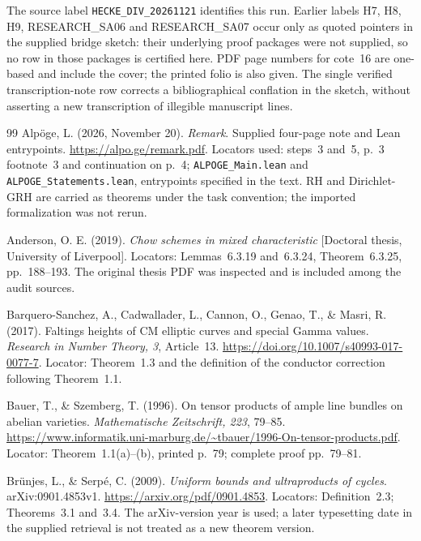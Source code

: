 The source label \texttt{HECKE\_DIV\_20261121} identifies this run. Earlier labels H7, H8, H9, RESEARCH\_SA06 and RESEARCH\_SA07 occur only as quoted pointers in the supplied bridge sketch: their underlying proof packages were not supplied, so no row in those packages is certified here. PDF page numbers for cote~16 are one-based and include the cover; the printed folio is also given. The single verified transcription-note row corrects a bibliographical conflation in the sketch, without asserting a new transcription of illegible manuscript lines.

\begin{thebibliography}{99}
Alp\"oge, L. (2026, November 20). \emph{Remark}. Supplied four-page note and Lean entrypoints. \url{https://alpo.ge/remark.pdf}. Locators used: steps~3 and~5, p.~3 footnote~3 and continuation on p.~4; \texttt{ALPOGE\_Main.lean} and \texttt{ALPOGE\_Statements.lean}, entrypoints specified in the text. RH and Dirichlet-GRH are carried as theorems under the task convention; the imported formalization was not rerun.

Anderson, O. E. (2019). \emph{Chow schemes in mixed characteristic} [Doctoral thesis, University of Liverpool]. Locators: Lemmas~6.3.19 and~6.3.24, Theorem~6.3.25, pp.~188--193. The original thesis PDF was inspected and is included among the audit sources.

Barquero-Sanchez, A., Cadwallader, L., Cannon, O., Genao, T., \& Masri, R. (2017). Faltings heights of CM elliptic curves and special Gamma values. \emph{Research in Number Theory, 3}, Article~13. \url{https://doi.org/10.1007/s40993-017-0077-7}. Locator: Theorem~1.3 and the definition of the conductor correction following Theorem~1.1.

Bauer, T., \& Szemberg, T. (1996). On tensor products of ample line bundles on abelian varieties. \emph{Mathematische Zeitschrift, 223}, 79--85. \url{https://www.informatik.uni-marburg.de/~tbauer/1996-On-tensor-products.pdf}. Locator: Theorem~1.1(a)--(b), printed p.~79; complete proof pp.~79--81.

Br\"unjes, L., \& Serp\'e, C. (2009). \emph{Uniform bounds and ultraproducts of cycles}. arXiv:0901.4853v1. \url{https://arxiv.org/pdf/0901.4853}. Locators: Definition~2.3; Theorems~3.1 and~3.4. The arXiv-version year is used; a later typesetting date in the supplied retrieval is not treated as a new theorem version.


\end{thebibliography}
